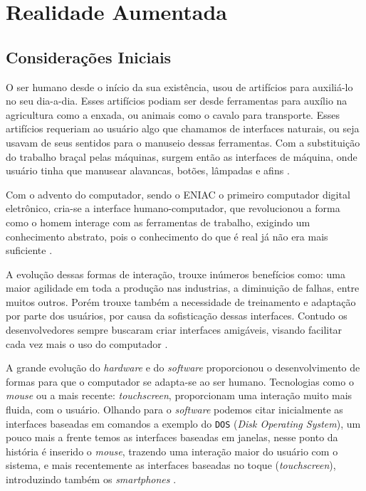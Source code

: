 \chapter {Realidade Aumentada}
\label{cap:XXX}


\section {Considerações Iniciais}
O ser humano desde o início da sua existência, usou de artifícios para auxiliá-lo no seu dia-a-dia. Esses artifícios podiam ser desde ferramentas para auxílio na agricultura como a enxada, ou animais como o cavalo para transporte. Esses artifícios requeriam ao usuário algo que chamamos de interfaces naturais, ou seja usavam de seus sentidos para o manuseio dessas ferramentas. Com a substituição do trabalho braçal pelas máquinas, surgem então as interfaces de máquina, onde usuário tinha que manusear alavancas, botões, lâmpadas e afins \cite{kirner2007}.

Com o advento do computador, sendo o ENIAC o primeiro computador digital eletrônico, cria-se a interface humano-computador, que revolucionou a forma como o homem interage com as ferramentas de trabalho, exigindo um conhecimento abstrato, pois o conhecimento do que é real já não era mais suficiente \cite{eniac,kirner2007}.

A evolução dessas formas de interação, trouxe inúmeros benefícios como: uma maior agilidade em toda a produção nas industrias, a diminuição de falhas, entre muitos outros. Porém trouxe também a necessidade de treinamento e adaptação por parte dos usuários, por causa da sofisticação dessas interfaces. Contudo os desenvolvedores sempre buscaram criar interfaces amigáveis, visando facilitar cada vez mais o uso do computador \cite{kirner2007}.

A grande evolução do \textit{hardware} e do \textit{software} proporcionou o desenvolvimento de formas para que o computador se adapta-se ao ser humano. Tecnologias como o \textit{mouse} ou a mais recente: \textit{touchscreen}, proporcionam uma interação muito mais fluida, com o usuário. Olhando para o \textit{software} podemos citar inicialmente as interfaces baseadas em comandos a exemplo do \verb'DOS' (\textit{Disk Operating System}), um pouco mais a frente temos as interfaces baseadas em janelas, nesse ponto da história é inserido o \textit{mouse}, trazendo uma interação maior do usuário com o sistema, e mais recentemente as interfaces baseadas no toque (\textit{touchscreen}), introduzindo também os \textit{smartphones} \cite{kirner2007}.

